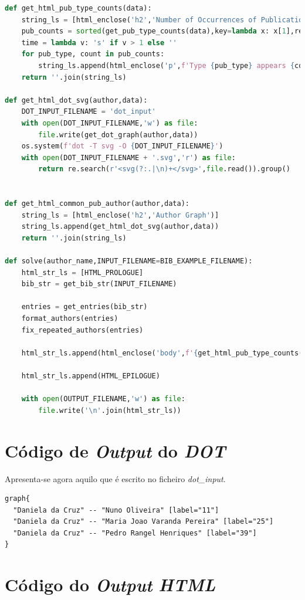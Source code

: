 \documentclass[11pt,a4paper]{report}
\begin{document}
\begin{appendices}
\begin{lstlisting}[language=python]
def get_html_pub_type_counts(data):
    string_ls = [html_enclose('h2','Number of Occurrences of Publication Types')]
    pub_counts = sorted(get_pub_type_counts(data),key=lambda x: x[1],reverse=True)
    time = lambda v: 's' if v > 1 else ''
    for pub_type, count in pub_counts:
        string_ls.append(html_enclose('p',f'Type {pub_type} appears {count} time{time(count)}'))
    return ''.join(string_ls)

def get_html_dot_svg(author,data):
    DOT_INPUT_FILENAME = 'dot_input'
    with open(DOT_INPUT_FILENAME,'w') as file:
        file.write(get_dot_graph(author,data))
    os.system(f'dot -T svg -O {DOT_INPUT_FILENAME}')
    with open(DOT_INPUT_FILENAME + '.svg','r') as file:
        return re.search(r'<svg(?:.|\n)+</svg>',file.read()).group()


def get_html_common_pub_author(author,data):
    string_ls = [html_enclose('h2','Author Graph')]
    string_ls.append(get_html_dot_svg(author,data))
    return ''.join(string_ls)

def solve(author_name,INPUT_FILENAME=BIB_EXAMPLE_FILENAME):
    html_str_ls = [HTML_PROLOGUE]
    bib_str = get_bib_str(INPUT_FILENAME)

    entries = get_entries(bib_str)
    format_authors(entries)
    fix_repeated_authors(entries)

    html_str_ls.append(html_enclose('body',f'{get_html_pub_type_counts(entries)}{get_html_common_pub_author(author_name,entries)}{get_html_pub_type_index(entries)}{get_html_author_index(entries)}'))

    html_str_ls.append(HTML_EPILOGUE)

    with open(OUTPUT_FILENAME,'w') as file:
        file.write('\n'.join(html_str_ls))

\end{lstlisting}
\chapter{Código de \emph{Output} do \emph{DOT}}

Apresenta-se agora aquilo que é escrito no ficheiro \emph{dot\_input}.

\begin{lstlisting}
graph{
  "Daniela da Cruz" -- "Nuno Oliveira" [label="11"]
  "Daniela da Cruz" -- "Maria Joao Varanda Pereira" [label="25"]
  "Daniela da Cruz" -- "Pedro Rangel Henriques" [label="39"]
}
\end{lstlisting}
\chapter{Código do \emph{Output} \emph{HTML}}


\end{appendices}
\end{document}
